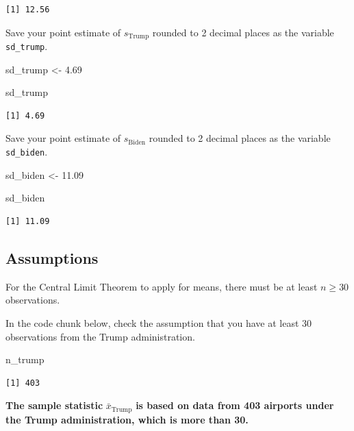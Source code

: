 \documentclass[
  letterpaper,
  DIV=11,
  numbers=noendperiod]{scrartcl}
\newenvironment{Shaded}{\begin{snugshade}}{\end{snugshade}}
\newcommand{\FloatTok}[1]{\textcolor[rgb]{0.68,0.00,0.00}{#1}}
\newcommand{\NormalTok}[1]{\textcolor[rgb]{0.00,0.23,0.31}{#1}}
\newcommand{\OtherTok}[1]{\textcolor[rgb]{0.00,0.23,0.31}{#1}}
\begin{document}
\begin{verbatim}
[1] 12.56
\end{verbatim}

Save your point estimate of \(s_{\text{Trump}}\) rounded to 2 decimal
places as the variable \texttt{sd\_trump}.

\begin{Shaded}
\begin{Highlighting}[]
\NormalTok{sd\_trump }\OtherTok{\textless{}{-}} \FloatTok{4.69}

\NormalTok{sd\_trump}
\end{Highlighting}
\end{Shaded}

\begin{verbatim}
[1] 4.69
\end{verbatim}

Save your point estimate of \(s_{\text{Biden}}\) rounded to 2 decimal
places as the variable \texttt{sd\_biden}.

\begin{Shaded}
\begin{Highlighting}[]
\NormalTok{sd\_biden }\OtherTok{\textless{}{-}} \FloatTok{11.09}

\NormalTok{sd\_biden}
\end{Highlighting}
\end{Shaded}

\begin{verbatim}
[1] 11.09
\end{verbatim}

\subsection{Assumptions}\label{assumptions-1}

For the Central Limit Theorem to apply for means, there must be at least
\(n\ge30\) observations.

In the code chunk below, check the assumption that you have at least 30
observations from the Trump administration.

\begin{Shaded}
\begin{Highlighting}[]
\NormalTok{n\_trump}
\end{Highlighting}
\end{Shaded}

\begin{verbatim}
[1] 403
\end{verbatim}

\begin{tcolorbox}[enhanced jigsaw, toprule=.15mm, breakable, leftrule=.75mm, bottomrule=.15mm, rightrule=.15mm, colback=white, opacityback=0, colframe=quarto-callout-warning-color-frame, left=2mm, arc=.35mm]

\textbf{The sample statistic} \(\bar{x}_{\text{Trump}}\) \textbf{is
based on data from 403 airports under the Trump administration, which is
more than 30.}

\end{tcolorbox}
\end{document}
